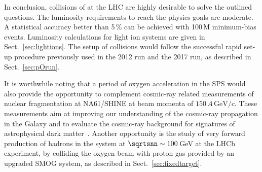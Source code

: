 \documentclass[../report.tex]{subfiles}
\providecommand{\main}{..}
\begin{document}
In conclusion, collisions of \pO at the LHC are highly desirable to solve the outlined questions. The luminosity requirements to reach the physics goals are moderate. A statistical accuracy better than 5\,\% can be achieved with 100\,M minimum-bias events. Luminosity calculations for light ion systems are given in Sect.\ \ref{sec:lightions}. The setup of \pO collisions would follow the successful rapid set-up procedure previously used in the 2012 \pPb run and the 2017 \XeXe run, as described in Sect.~\ref{sec:pOrun}.

It is worthwhile noting that a period of oxygen acceleration in the SPS would also provide the opportunity to complement cosmic-ray related measurements of nuclear fragmentation at NA61/SHINE\cite{Aduszkiewicz:2287004,Aduszkiewicz:2309890} at beam momenta of $150\,A\,\text{GeV}/c$. These measurements aim at improving our understanding of the cosmic-ray propagation in the Galaxy and to evaluate the cosmic-ray background for signatures of astrophysical dark matter~\cite{Genolini:2018ekk}. Another opportunity is the study of very forward production of hadrons in the \pO system at $\sqrtsnn \sim 100$\,GeV at the LHCb experiment, by colliding the oxygen beam with proton gas provided by an upgraded SMOG system, as described in Sect.~\ref{sec:fixedtarget}.



\end{document}
